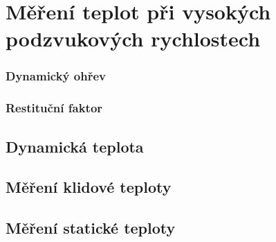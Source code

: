 \section{Měření teplot při vysokých podzvukových rychlostech} \label{sec:mereni-teplot}
    


    \subsubsection{Dynamický ohřev}
    \subsubsection{Restituční faktor}
    
    \subsection{Dynamická teplota}

    \subsection{Měření klidové teploty}

    \subsection{Měření statické teploty}